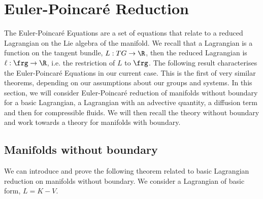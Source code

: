

\section{Euler-Poincar\'e Reduction}
The Euler-Poincar\'e Equations are a set of equations that relate to a reduced Lagrangian on the Lie algebra of the manifold. We recall that a Lagrangian is a function on the tangent bundle, $L : TG \to \R$, then the reduced Lagrangian is $\ell : \frg \to \R$, i.e. the restriction of $L$ to $\frg$. The following result characterises the Euler-Poincar\'e Equations in our current case. This is the first of very similar theorems, depending on our assumptions about our groups and systems. In this section, we will consider Euler-Poincar\'e reduction of manifolds without boundary for a basic Lagrangian, a Lagrangian with an advective quantity, a diffusion term and then for compressible fluids. We will then recall the theory without boundary and work towards a theory for manifolds with boundary.

\subsection{Manifolds without boundary}
We can introduce and prove the following theorem related to basic Lagrangian reduction on manifolds without boundary. We consider a Lagrangian of basic form, $L = K - V$.

